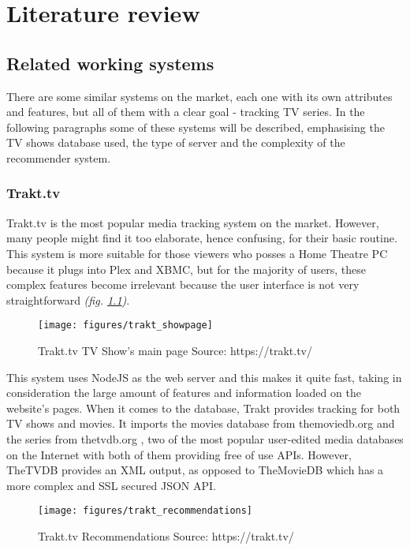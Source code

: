\chapter{Literature review}

\section{Related working systems}

There are some similar systems on the market, each one with its own attributes and features, but all of them with a clear goal - tracking TV series. In the following paragraphs some of these systems will be described, emphasising the TV shows database used, the type of server and the complexity of the recommender system.

\subsection{Trakt.tv}

Trakt.tv \cite{2} is the most popular media tracking system on the market. However, many people might find it too elaborate, hence confusing, for their basic routine. This system is more suitable for those viewers who posses a Home Theatre PC because it plugs into Plex and XBMC, but for the majority of users, these complex features become irrelevant because the user interface is not very straightforward \textit{(fig. \ref{fig:traktshowpage})}.

\begin{figure}[h]
\centering
\texttt{[image: figures/trakt\_showpage]}
\caption{Trakt.tv TV Show's main page \newline Source: https://trakt.tv/}
\label{fig:traktshowpage}
\end{figure}

This system uses NodeJS as the web server and this makes it quite fast, taking in consideration the large amount of features and information loaded on the website's pages. When it comes to the database, Trakt provides tracking for both TV shows and movies. It imports the movies database from themoviedb.org \cite{3} and the series from thetvdb.org \cite{4}, two of the most popular user-edited media databases on the Internet with both of them providing free of use APIs. However, TheTVDB provides an XML output, as opposed to TheMovieDB which has a more complex and SSL secured JSON API.

\begin{wrapfigure}{l}{0.5\textwidth}
\centering
\texttt{[image: figures/trakt\_recommendations]}
\caption{Trakt.tv Recommendations \newline Source: https://trakt.tv/}
\vspace{-1em}
\label{fig:traktrecommender}
\end{wrapfigure}

